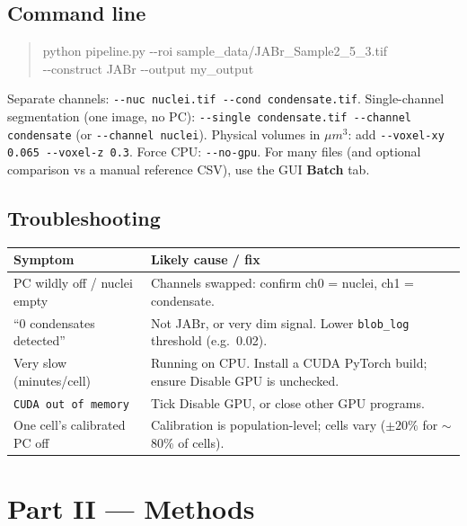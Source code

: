 \documentclass[11pt]{article}
\newcommand{\code}[1]{\texttt{\small #1}}
\begin{document}
\subsection{Command line}
\begin{quote}\ttfamily\small python pipeline.py -{}-roi sample\_data/JABr\_Sample2\_5\_3.tif\\ \hspace*{1.5em}-{}-construct JABr -{}-output my\_output\end{quote}
Separate channels: \code{-{}-nuc nuclei.tif -{}-cond condensate.tif}. Single-channel
segmentation (one image, no PC): \code{-{}-single condensate.tif -{}-channel condensate}
(or \code{-{}-channel nuclei}). Physical volumes in $\mu m^3$: add
\code{-{}-voxel-xy 0.065 -{}-voxel-z 0.3}. Force CPU: \code{-{}-no-gpu}. For many files
(and optional comparison vs a manual reference CSV), use the GUI \textbf{Batch} tab.

\subsection{Troubleshooting}
\begin{center}
\begin{tabular}{>{\RaggedRight}p{5cm} >{\RaggedRight}p{8cm}}
\toprule
\textbf{Symptom} & \textbf{Likely cause / fix}\\
\midrule
PC wildly off / nuclei empty & Channels swapped: confirm ch0 = nuclei, ch1 = condensate.\\
``0 condensates detected'' & Not JABr, or very dim signal. Lower \code{blob\_log} threshold (e.g.\ 0.02).\\
Very slow (minutes/cell) & Running on CPU. Install a CUDA PyTorch build; ensure Disable GPU is unchecked.\\
\code{CUDA out of memory} & Tick Disable GPU, or close other GPU programs.\\
One cell's calibrated PC off & Calibration is population-level; cells vary ($\pm 20\%$ for $\sim$80\% of cells).\\
\bottomrule
\end{tabular}
\end{center}
\newpage

\section{Part II --- Methods}
\end{document}
